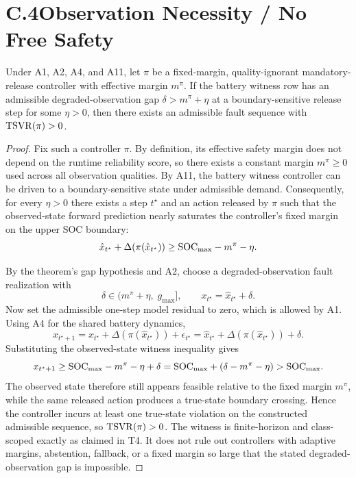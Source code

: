\section{C.4\quad Observation Necessity / No Free Safety}\label{sec:proof-no-free}
\begin{theorem}[restated]
Under A1, A2, A4, and A11, let $\pi$ be a fixed-margin,
quality-ignorant mandatory-release controller with effective margin $m^\pi$.
If the battery witness row has an admissible degraded-observation gap
$\delta>m^\pi+\eta$ at a boundary-sensitive release step for some
$\eta>0$, then there exists an admissible fault sequence with
$\mathrm{TSVR}(\pi)>0$.
\end{theorem}
\begin{proof}
Fix such a controller $\pi$.  By definition, its effective safety
margin does not depend on the runtime reliability score, so there exists a
constant margin $m^\pi\ge 0$ used across all observation qualities.  By A11,
the battery witness controller can be driven to a boundary-sensitive state
under admissible demand.  Consequently, for every $\eta>0$ there exists a
step $t^\star$ and an action released by $\pi$ such that the observed-state
forward prediction nearly saturates the controller's fixed margin on the upper
SOC boundary:
\[
  \hat{x}_{t^\star} + \Delta(\pi(\hat{x}_{t^\star}))
  \ge
  \mathrm{SOC}_{\max} - m^\pi - \eta.
\]

By the theorem's gap hypothesis and A2, choose a degraded-observation fault
realization with
\[
  \delta \in (m^\pi+\eta,\; g_{\max}],
  \qquad
  x_{t^\star}=\hat{x}_{t^\star}+\delta.
\]
Now set the admissible one-step model residual to zero, which is allowed by A1.
Using A4 for the shared battery dynamics,
\[
  x_{t^\star+1}
  =
  x_{t^\star} + \Delta(\pi(\hat{x}_{t^\star})) + \epsilon_{t^\star}
  =
  \hat{x}_{t^\star} + \Delta(\pi(\hat{x}_{t^\star})) + \delta.
\]
Substituting the observed-state witness inequality gives
\[
  x_{t^\star+1}
  \ge
  \mathrm{SOC}_{\max} - m^\pi - \eta + \delta
  =
  \mathrm{SOC}_{\max} + (\delta-m^\pi-\eta)
  >
  \mathrm{SOC}_{\max}.
\]
The observed state therefore still appears feasible relative to the fixed
margin $m^\pi$, while the same released action produces a true-state boundary
crossing.  Hence the controller incurs at least one true-state violation on
the constructed admissible sequence, so $\mathrm{TSVR}(\pi)>0$.  The witness is
finite-horizon and class-scoped exactly as claimed in T4.  It does not rule out
controllers with adaptive margins, abstention, fallback, or a fixed margin so
large that the stated degraded-observation gap is impossible.  \qedhere
\end{proof}

